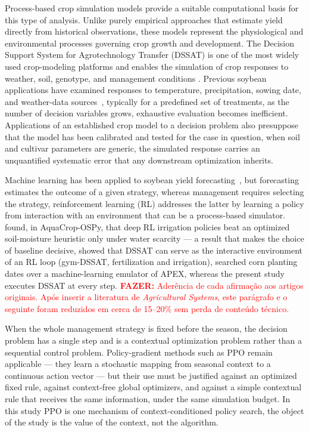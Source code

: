 \documentclass[times,final,authoryear]{elsarticle}
\begin{document}
Process-based crop simulation models provide a suitable computational basis for this type of analysis. Unlike purely empirical approaches that estimate yield directly from historical observations, these models represent the physiological and environmental processes governing crop growth and development. The Decision Support System for Agrotechnology Transfer (DSSAT) is one of the most widely used crop-modeling platforms and enables the simulation of crop responses to weather, soil, genotype, and management conditions \citep{ovando2018dssatsoybean, singh2024dssatsoybean}. Previous soybean applications have examined responses to temperature, precipitation, sowing date, and weather-data sources~\citep{battisti2017soybeanmodels, battisti2018climatesensitivity, ovando2018dssatsoybean}, typically for a predefined set of treatments, as the number of decision variables grows, exhaustive evaluation becomes inefficient. Applications of an established crop model to a decision problem also presuppose that the model has been calibrated and tested for the case in question, when soil and cultivar parameters are generic, the simulated response carries an unquantified systematic error that any downstream optimization inherits.

Machine learning has been applied to soybean yield forecasting~\citep{vonbloh2023mlsoybean, schwalbert2020soybeanforecast}, but forecasting estimates the outcome of a given strategy, whereas management requires selecting the strategy, reinforcement learning (RL) addresses the latter by learning a policy from interaction with an environment that can be a process-based simulator. \citet{kelly2024assessing} found, in AquaCrop-OSPy, that deep RL irrigation policies beat an optimized soil-moisture heuristic only under water scarcity --- a result that makes the choice of baseline decisive, \citet{balderas2025comparative} showed that DSSAT can serve as the interactive environment of an RL loop (gym-DSSAT, fertilization and irrigation), \citet{noa2026hybrid} searched corn planting dates over a machine-learning emulator of APEX, whereas the present study executes DSSAT at every step. \textcolor{red}{\textbf{FAZER:} Aderência de cada afirmação aos artigos originais. Após inserir a literatura de \textit{Agricultural Systems}, este parágrafo e o seguinte foram reduzidos em cerca de 15--20\% sem perda de conteúdo técnico.}

When the whole management strategy is fixed before the season, the decision problem has a single step and is a contextual optimization problem rather than a sequential control problem. Policy-gradient methods such as PPO remain applicable --- they learn a stochastic mapping from seasonal context to a continuous action vector --- but their use must be justified against an optimized fixed rule, against context-free global optimizers, and against a simple contextual rule that receives the same information, under the same simulation budget. In this study PPO is one mechanism of context-conditioned policy search, the object of the study is the value of the context, not the algorithm.
\end{document}
